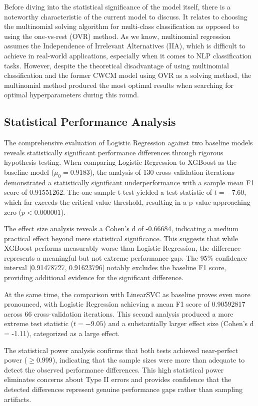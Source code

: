 \documentclass[
  titlepage]{article}
\begin{document}
Before diving into the statistical significance of the model itself,
there is a noteworthy characteristic of the current model to discuss. It
relates to choosing the multinomial solving algorithm for multi-class
classification as opposed to using the one-vs-rest (OVR) method. As we
know, multinomial regression assumes the Independence of Irrelevant
Alternatives (IIA), which is difficult to achieve in real-world
applications, especially when it comes to NLP classification tasks.
However, despite the theoretical disadvantage of using multinomial
classification and the former CWCM model using OVR as a solving method,
the multinomial method produced the most optimal results when searching
for optimal hyperparameters during this round.

\subsection{Statistical Performance
Analysis}\label{statistical-performance-analysis}

The comprehensive evaluation of Logistic Regression against two baseline
models reveals statistically significant performance differences through
rigorous hypothesis testing. When comparing Logistic Regression to
XGBoost as the baseline model (\(\mu_0 = 0.9183\)), the analysis of 130
cross-validation iterations demonstrated a statistically significant
underperformance with a sample mean F1 score of 0.91551262. The
one-sample t-test yielded a test statistic of \(t = -7.60\), which far
exceeds the critical value threshold, resulting in a p-value approaching
zero (\(p < 0.000001\)).

The effect size analysis reveals a Cohen's d of -0.66684, indicating a
medium practical effect beyond mere statistical significance. This
suggests that while XGBoost performs measurably worse than Logistic
Regression, the difference represents a meaningful but not extreme
performance gap. The 95\% confidence interval {[}0.91478727,
0.91623796{]} notably excludes the baseline F1 score, providing
additional evidence for the significant difference.

At the same time, the comparison with LinearSVC as baseline proves even
more pronounced, with Logistic Regression achieving a mean F1 score of
0.90592817 across 66 cross-validation iterations. This second analysis
produced a more extreme test statistic (\(t = -9.05\)) and a
substantially larger effect size (Cohen's d = -1.11), categorized as a
large effect.

The statistical power analysis confirms that both tests achieved
near-perfect power (\(\geq 0.999\)), indicating that the sample sizes
were more than adequate to detect the observed performance differences.
This high statistical power eliminates concerns about Type II errors and
provides confidence that the detected differences represent genuine
performance gaps rather than sampling artifacts.
\end{document}
